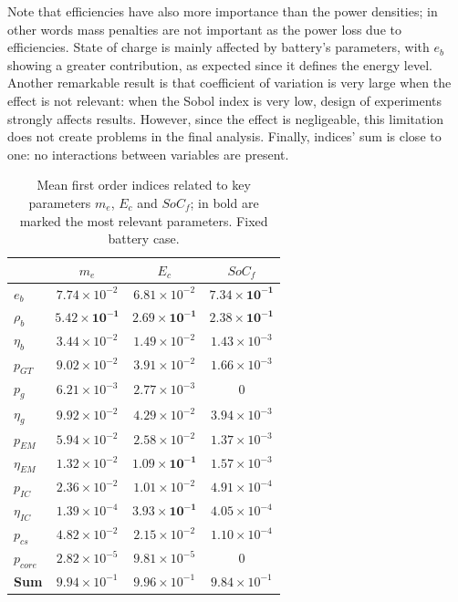 Note that efficiencies have also more importance than the power densities; in other words mass penalties are not important as the power loss due to efficiencies. 
State of charge is mainly affected by battery's parameters, with $e_b$ showing a greater contribution, as expected since it defines the energy level.
Another remarkable result is that coefficient of variation is very large when the effect is not relevant: when the Sobol index is very low, design of experiments strongly affects results. 
However, since the effect is negligeable, this limitation does not create problems in the final analysis.
Finally, indices' sum is close to one: no interactions between variables are present.
\begin{table}[!h]
	\centering
	\begin{tabular}{l c c c}
		\cline{2-4} 
		&  $m_e$ & $E_c$ & $SoC_f$ \\
		\hline 
		$e_b$ & $7.74\times10^{-2}$ & $6.81\times10^{-2}$ & $\mathbf{7.34\times10^{-1}}$ \\
		$\rho_b$ & $\mathbf{5.42\times10^{-1}}$ & $\mathbf{2.69\times10^{-1}}$ & $\mathbf{2.38\times10^{-1}}$ \\
		$\eta_b$ & $3.44\times10^{-2}$ & $1.49\times10^{-2}$ & $1.43\times10^{-3}$ \\
		
		$p_{GT}$ & $9.02\times10^{-2}$ & $3.91\times10^{-2}$ & $1.66\times10^{-3}$ \\
		$p_g$ & $6.21\times10^{-3}$ & $2.77\times10^{-3}$ & 0 \\
		$\eta_g$ & $9.92\times10^{-2}$ & $4.29\times10^{-2}$ & $3.94\times10^{-3}$ \\
		
		$p_{EM}$ & $5.94\times10^{-2}$ & $2.58\times10^{-2}$ & $1.37\times10^{-3}$ \\
		$\eta_{EM}$ & $1.32\times10^{-2}$ & $\mathbf{1.09\times10^{-1}}$ & $1.57\times10^{-3}$ \\
		
		$p_{IC}$ & $2.36\times10^{-2}$ & $1.01\times10^{-2}$ & $4.91\times10^{-4}$ \\
		$\eta_{IC}$ & $1.39\times10^{-4}$ & $\mathbf{3.93\times10^{-1}}$ & $4.05\times10^{-4}$ \\
		
		$p_{cs}$ & $4.82\times10^{-2}$ & $2.15\times10^{-2}$ & $1.10\times10^{-4}$ \\
		
		$p_{core}$ & $2.82\times10^{-5}$ & $9.81\times10^{-5}$ & 0 \\	
		\hline
		\textbf{Sum} & $9.94\times10^{-1}$ & $9.96\times10^{-1}$ & $9.84\times10^{-1}$ \\
		\hline
	\end{tabular}
	\caption{Mean first order indices related to key parameters $m_e$, $E_c$ and $SoC_f$; in bold are marked the most relevant parameters. Fixed battery case.}
	\label{tab:techno_sens_fix_batt_mean}
\end{table} 
